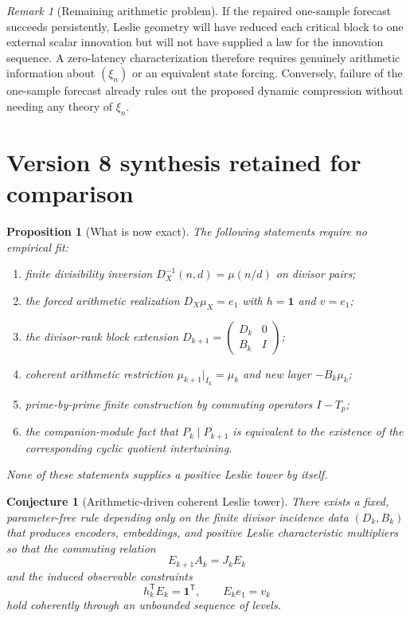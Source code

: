 \documentclass[11pt]{amsart}
\numberwithin{equation}{section}
\theoremstyle{plain}
\newtheorem{proposition}[theorem]{Proposition}
\newtheorem{conjecture}[theorem]{Conjecture}
\theoremstyle{definition}
\theoremstyle{remark}
\newtheorem{remark}[theorem]{Remark}
\begin{document}
\begin{remark}[Remaining arithmetic problem]
\label{rem:remaining_arithmetic_v7}
If the repaired one-sample forecast succeeds persistently, Leslie geometry will have reduced each critical block to one external scalar innovation but will not have supplied a law for the innovation sequence. A zero-latency characterization therefore requires genuinely arithmetic information about $(\xi_n)$ or an equivalent state forcing. Conversely, failure of the one-sample forecast already rules out the proposed dynamic compression without needing any theory of $\xi_n$.
\end{remark}


\section{Version 8 synthesis retained for comparison}
\label{sec:v8_synthesis}

\begin{proposition}[What is now exact]
\label{prop:v8_exact_summary}
The following statements require no empirical fit:
\begin{enumerate}
\item finite divisibility inversion
$D_X^{-1}(n,d)=\mu(n/d)$ on divisor pairs;
\item the forced arithmetic realization
$D_X\mu_X=e_1$ with $h=\mathbf1$ and $v=e_1$;
\item the divisor-rank block extension
$D_{k+1}=\left(\begin{smallmatrix}D_k&0\\B_k&I\end{smallmatrix}\right)$;
\item coherent arithmetic restriction
$\mu_{k+1}|_{I_k}=\mu_k$ and new layer $-B_k\mu_k$;
\item prime-by-prime finite construction by commuting operators $I-T_p$;
\item the companion-module fact that
$P_k\mid P_{k+1}$ is equivalent to the existence of the corresponding cyclic quotient
intertwining.
\end{enumerate}
None of these statements supplies a positive Leslie tower by itself.
\end{proposition}

\begin{conjecture}[Arithmetic-driven coherent Leslie tower]
\label{conj:arithmetic_driven_tower}
There exists a fixed, parameter-free rule depending only on the finite divisor incidence data
$(D_k,B_k)$ that produces encoders, embeddings, and positive Leslie characteristic multipliers
so that the commuting relation
\[
E_{k+1}A_k=J_kE_k
\]
and the induced observable constraints
\[
h_k^{\mathsf T}E_k=\mathbf1^{\mathsf T},
\qquad
E_ke_1=v_k
\]
hold coherently through an unbounded sequence of levels.
\end{conjecture}
\end{document}
